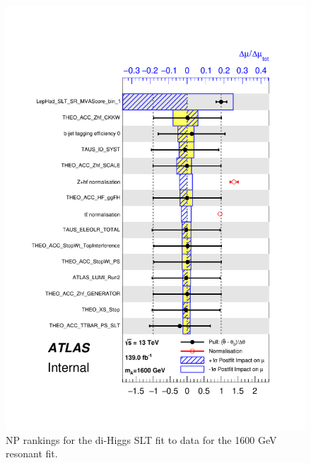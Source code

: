 \begin{figure}
\centering
\includegraphics[width=.8\textwidth]{figures/results/HH/LepHad/pulls_SigXsecOverSM_1600_SLT.pdf}
\caption{NP rankings for the di-Higgs \lephad SLT fit to data for the 1600 GeV resonant fit.}
\label{fig:LepHadPostfitNPRankings2HDM1600SLT}
\end{figure}

